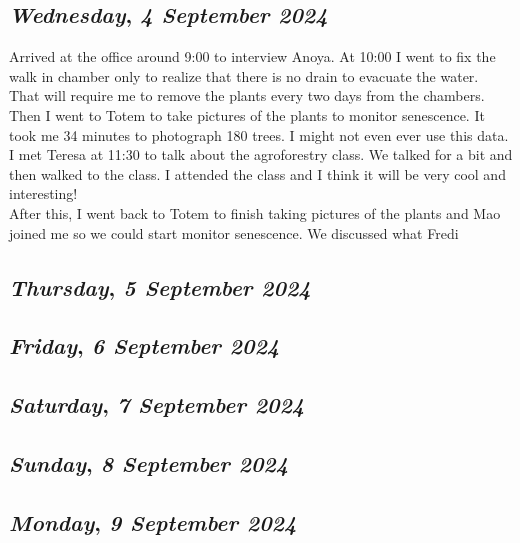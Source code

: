 \def\day{\textit{4 September 2024}}
\def\weekday{\textit{Wednesday}}
\subsection*{\weekday, \day}
Arrived at the office around 9:00 to interview Anoya.
At 10:00 I went to fix the walk in chamber only to realize that there is no drain to evacuate the water. That will require me to remove the plants every two days from the chambers.
Then I went to Totem to take pictures of the plants to monitor senescence. It took me 34 minutes to photograph 180 trees. I might not even ever use this data.\\

I met Teresa at 11:30 to talk about the agroforestry class.  We talked for a bit and then walked to the class. I attended the class and I think it will be very cool and interesting! \\
After this, I went back to Totem to finish taking pictures of the plants and Mao joined me so we could start monitor senescence. We discussed what Fredi 
\def\day{\textit{5 September 2024}}
\def\weekday{\textit{Thursday}}
\subsection*{\weekday, \day}

\def\day{\textit{6 September 2024}}
\def\weekday{\textit{Friday}}
\subsection*{\weekday, \day}

\def\day{\textit{7 September 2024}}
\def\weekday{\textit{Saturday}}
\subsection*{\weekday, \day}

\def\day{\textit{8 September 2024}}
\def\weekday{\textit{Sunday}}
\subsection*{\weekday, \day}

\def\day{\textit{9 September 2024}}
\def\weekday{\textit{Monday}}
\subsection*{\weekday, \day}

\def\day{\textit{10 September 2024}}
\def\weekday{\textit{Tuesday}}
